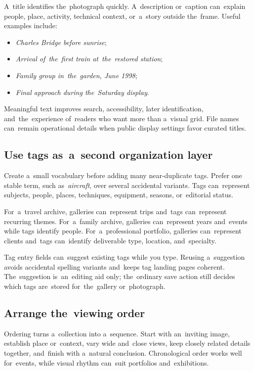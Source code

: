 \documentclass[11pt,a4paper]{article}
\begin{document}
A~title identifies the~photograph quickly. A~description or~caption can~explain
people, place, activity, technical context, or~a~story outside the~frame. Useful
examples include:

\begin{itemize}
  \item \emph{Charles Bridge before sunrise};
  \item \emph{Arrival of~the~first train at~the~restored station};
  \item \emph{Family group in~the~garden, June 1998};
  \item \emph{Final approach during the~Saturday display}.
\end{itemize}

Meaningful text improves search, accessibility, later identification,
and~the~experience of~readers who want more than a~visual grid. File names
can~remain operational details when public display settings favor curated
titles.

\subsection{Use tags as~a~second organization layer}

Create a~small vocabulary before adding many near-duplicate tags. Prefer one
stable term, such as~\emph{aircraft}, over several accidental variants. Tags
can~represent subjects, people, places, techniques, equipment, seasons,
or~editorial status.

For~a~travel archive, galleries can~represent trips and~tags can~represent
recurring themes. For~a~family archive, galleries can~represent years and~events
while tags identify people. For~a~professional portfolio, galleries
can~represent clients and~tags can~identify deliverable type, location,
and~specialty.

Tag entry fields can~suggest existing tags while you type. Reusing a~suggestion
avoids accidental spelling variants and~keeps tag landing pages coherent.
The~suggestion is~an~editing aid only; the~ordinary save action still decides
which tags are~stored for~the~gallery or~photograph.

\subsection{Arrange the~viewing order}

Ordering turns a~collection into a~sequence. Start with an~inviting image,
establish place or~context, vary wide and~close views, keep closely related
details together, and~finish with a~natural conclusion. Chronological order
works well for~events, while visual rhythm can~suit portfolios and~exhibitions.
\end{document}
